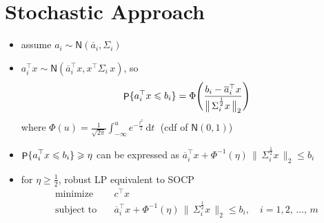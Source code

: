 \documentclass[11pt]{extarticle}
\newcommand{\ds}{\displaystyle}
\DeclareMathOperator\prb{{\sf P}}
\theoremstyle{definition}
\begin{document}
\newpage

\section*{Stochastic Approach}

\begin{itemize}
  \item assume $\ds a_i\sim\mathsf{N}(\overline{a}_i, \Sigma_i)$
  \item $\ds a_i^\top x\sim\mathsf{N}(\overline{a}_i^\top x, x^\top\Sigma_i\,x)$, so
    \begin{align*}
      \prb\{a_i^\top x\leqslant b_i\} = \Phi\Bigg(\frac{b_i - \overline{a}_i^\top x}{\big\|\,\Sigma_i^\frac{1}{2} x\,\big\|_2}\Bigg)
    \end{align*}
    where $\ds\Phi(u) = \frac{1}{\sqrt{2\pi}}\int_{-\infty}^u e^{-\frac{t^2}{2}}\,\text{d}t\;$ (cdf of $\mathsf{N}(0, 1)$)
  \item $\ds\prb\{a_i^\top x\leqslant b_i\}\geqslant\eta$ can be expressed as $\overline{a}_i^\top x + \Phi^{-1}(\eta)\,\big\|\,\Sigma_i^\frac{1}{2} x\,\big\|_2\leqslant b_i$
  \item for $\ds\eta\geqslant\frac{1}{2}$, robust LP equivalent to SOCP
    \begin{align*}
      \text{minimize}\quad & c^\top x \\
      \text{subject to}\quad & \overline{a}_i^\top x + \Phi^{-1}(\eta)\,\big\|\,\Sigma_i^\frac{1}{2} x\,\big\|_2\leqslant b_i, \quad i = 1, 2,\,\ldots,\,m 
    \end{align*}
\end{itemize}

\newpage
\end{document}
